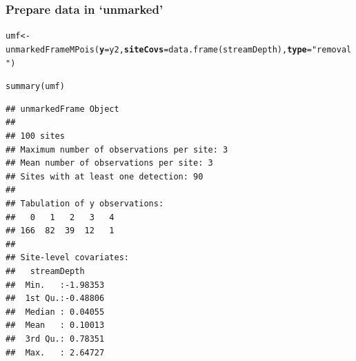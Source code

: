 \documentclass[color=usenames,dvipsnames]{beamer}\usepackage[]{graphicx}\usepackage[]{color}
\makeatletter
\newcommand{\hlstr}[1]{\textcolor[rgb]{0.749,0.012,0.012}{#1}}%
\newcommand{\hlstd}[1]{\textcolor[rgb]{0,0,0}{#1}}%
\newcommand{\hlkwb}[1]{\textcolor[rgb]{0,0.341,0.682}{#1}}%
\newcommand{\hlkwc}[1]{\textcolor[rgb]{0,0,0}{\textbf{#1}}}%
\newcommand{\hlkwd}[1]{\textcolor[rgb]{0.004,0.004,0.506}{#1}}%
\newenvironment{kframe}{%
 \def\at@end@of@kframe{}%
 \ifinner\ifhmode%
  \def\at@end@of@kframe{\end{minipage}}%
  \begin{minipage}{\columnwidth}%
 \fi\fi%
 \def\FrameCommand##1{\hskip\@totalleftmargin \hskip-\fboxsep
 \colorbox{shadecolor}{##1}\hskip-\fboxsep
     \hskip-\linewidth \hskip-\@totalleftmargin \hskip\columnwidth}%
 \MakeFramed {\advance\hsize-\width
   \@totalleftmargin\z@ \linewidth\hsize
   \@setminipage}}%
 {\par\unskip\endMakeFramed%
 \at@end@of@kframe}
\newenvironment{knitrout}{}{} %
\makeatother
\begin{document}
\begin{frame}[fragile]
  \frametitle{Prepare data in `unmarked'}
  \small
\begin{knitrout}\tiny
{}\color{fgcolor}\begin{kframe}
\begin{alltt}
\hlstd{umf} \hlkwb{<-} \hlkwd{unmarkedFrameMPois}\hlstd{(}\hlkwc{y}\hlstd{=y2,} \hlkwc{siteCovs}\hlstd{=}\hlkwd{data.frame}\hlstd{(streamDepth),} \hlkwc{type}\hlstd{=}\hlstr{"removal"}\hlstd{)}
\end{alltt}
\end{kframe}
\end{knitrout}
\pause
\begin{knitrout}\scriptsize
{}\color{fgcolor}\begin{kframe}
\begin{alltt}
\hlkwd{summary}\hlstd{(umf)}
\end{alltt}
\begin{verbatim}
## unmarkedFrame Object
## 
## 100 sites
## Maximum number of observations per site: 3 
## Mean number of observations per site: 3 
## Sites with at least one detection: 90 
## 
## Tabulation of y observations:
##   0   1   2   3   4 
## 166  82  39  12   1 
## 
## Site-level covariates:
##   streamDepth      
##  Min.   :-1.98353  
##  1st Qu.:-0.48806  
##  Median : 0.04055  
##  Mean   : 0.10013  
##  3rd Qu.: 0.78351  
##  Max.   : 2.64727
\end{verbatim}
\end{kframe}
\end{knitrout}
\end{frame}



\end{document}
